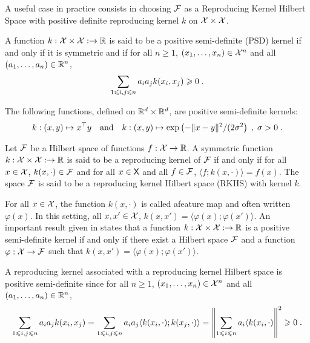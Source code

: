 A useful case in practice consists in choosing $\mathcal{F}$ as a Reproducing Kernel Hilbert Space with positive definite reproducing kernel $k$ on $\mathcal{X}\times \mathcal{X}$.

\begin{shaded}
\begin{definition}
\label{def:kernel}
A function $k:\mathcal{X}\times\mathcal{X}:\to \mathbb{R}$ is said to be a positive semi-definite (PSD) kernel if and only if it is symmetric and if for all $n\geqslant 1$, $(x_1,\ldots,x_n)\in\mathcal{X}^n$ and all $(a_1,\ldots,a_n)\in\mathbb{R}^n$,
\[
\sum_{1\leqslant i,j\leqslant n}a_ia_jk(x_i,x_j) \geqslant 0\;.
\]
\end{definition}
\end{shaded}

\begin{remark}
The following functions, defined on $\mathbb{R}^d\times\mathbb{R}^d$, are positive semi-definite kernels:
$$
k:(x,y)\mapsto x^\top y \quad\mathrm{and}\quad k:(x,y)\mapsto \mathrm{exp}\left(-\|x-y\|^2/(2\sigma^2\right)\;,\; \sigma>0\;.
$$
\end{remark}

\begin{shaded}
\begin{definition}
Let $\mathcal{F}$ be a Hilbert space of functions $f:\mathcal{X}\to\mathbb{R}$. A symmetric function $k:\mathcal{X}\times\mathcal{X}:\to \mathbb{R}$ is said to be a reproducing kernel of $\mathcal{F}$ if and only if for all $x\in\mathcal{X}$, $k(x,\cdot)\in\mathcal{F}$ and for all $x\in\mathsf{X}$ and all $f\in\mathcal{F}$, $\langle f; k(x,\cdot)\rangle = f(x)$. The space $\mathcal{F}$ is said to be a reproducing kernel Hilbert space (RKHS) with kernel $k$.
\end{definition}
\end{shaded}

\begin{remark}
For all $x\in\mathcal{X}$, the function $k(x,\cdot)$ is called afeature map and often written $\varphi(x)$. In this setting, all $x,x'\in\mathcal{X}$, $k(x,x') = \langle \varphi(x); \varphi(x')\rangle$. An important result given in \cite{} states that  a function $k:\mathcal{X}\times\mathcal{X}:\to \mathbb{R}$ is a positive semi-definite kernel if and only if there exist a Hilbert space $\mathcal{F}$ and a function $\varphi: \mathcal{X}\to \mathcal{F}$ such that $k(x,x') = \langle \varphi(x); \varphi(x')\rangle$.
\end{remark}

A reproducing kernel associated with a reproducing kernel Hilbert space is positive semi-definite since for all $n\geqslant 1$, $(x_1,\ldots,x_n)\in\mathcal{X}^n$ and all $(a_1,\ldots,a_n)\in\mathbb{R}^n$,
\[
\sum_{1\leqslant i,j\leqslant n}a_ia_jk(x_i,x_j) = \sum_{1\leqslant i,j\leqslant n}a_ia_j \langle k(x_i,\cdot);k(x_j,\cdot)\rangle = \left\|\sum_{1\leqslant i\leqslant n}a_i\langle k(x_i,\cdot)\right\|^2 \geqslant 0\;.
\]

